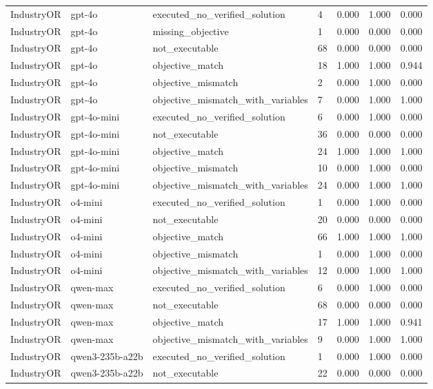 \begin{table}[t]
\begin{tabular}{lllllll}
IndustryOR & gpt-4o & executed\_no\_verified\_solution & 4 & 0.000 & 1.000 & 0.000 \\
IndustryOR & gpt-4o & missing\_objective & 1 & 0.000 & 0.000 & 0.000 \\
IndustryOR & gpt-4o & not\_executable & 68 & 0.000 & 0.000 & 0.000 \\
IndustryOR & gpt-4o & objective\_match & 18 & 1.000 & 1.000 & 0.944 \\
IndustryOR & gpt-4o & objective\_mismatch & 2 & 0.000 & 1.000 & 0.000 \\
IndustryOR & gpt-4o & objective\_mismatch\_with\_variables & 7 & 0.000 & 1.000 & 1.000 \\
IndustryOR & gpt-4o-mini & executed\_no\_verified\_solution & 6 & 0.000 & 1.000 & 0.000 \\
IndustryOR & gpt-4o-mini & not\_executable & 36 & 0.000 & 0.000 & 0.000 \\
IndustryOR & gpt-4o-mini & objective\_match & 24 & 1.000 & 1.000 & 1.000 \\
IndustryOR & gpt-4o-mini & objective\_mismatch & 10 & 0.000 & 1.000 & 0.000 \\
IndustryOR & gpt-4o-mini & objective\_mismatch\_with\_variables & 24 & 0.000 & 1.000 & 1.000 \\
IndustryOR & o4-mini & executed\_no\_verified\_solution & 1 & 0.000 & 1.000 & 0.000 \\
IndustryOR & o4-mini & not\_executable & 20 & 0.000 & 0.000 & 0.000 \\
IndustryOR & o4-mini & objective\_match & 66 & 1.000 & 1.000 & 1.000 \\
IndustryOR & o4-mini & objective\_mismatch & 1 & 0.000 & 1.000 & 0.000 \\
IndustryOR & o4-mini & objective\_mismatch\_with\_variables & 12 & 0.000 & 1.000 & 1.000 \\
IndustryOR & qwen-max & executed\_no\_verified\_solution & 6 & 0.000 & 1.000 & 0.000 \\
IndustryOR & qwen-max & not\_executable & 68 & 0.000 & 0.000 & 0.000 \\
IndustryOR & qwen-max & objective\_match & 17 & 1.000 & 1.000 & 0.941 \\
IndustryOR & qwen-max & objective\_mismatch\_with\_variables & 9 & 0.000 & 1.000 & 1.000 \\
IndustryOR & qwen3-235b-a22b & executed\_no\_verified\_solution & 1 & 0.000 & 1.000 & 0.000 \\
IndustryOR & qwen3-235b-a22b & not\_executable & 22 & 0.000 & 0.000 & 0.000 \\

\end{tabular}
\end{table}

